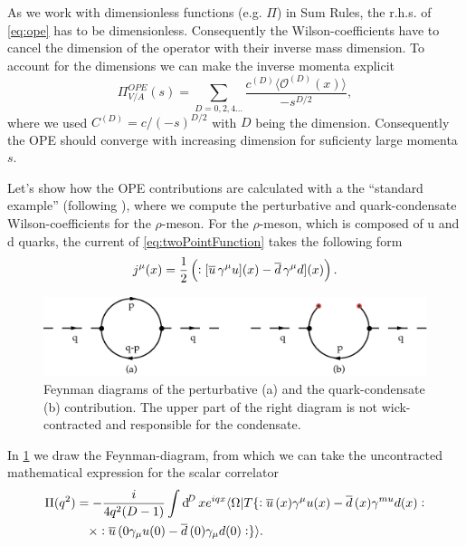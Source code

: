 \documentclass[../../index.tex]{subfiles}
\begin{document}
As we work with dimensionless functions (e.g. $\Pi$) in Sum Rules, the r.h.s. of
\cref{eq:ope} has to be dimensionless. Consequently the Wilson-coefficients have
to cancel the dimension of the operator with their inverse mass dimension. To
account for the dimensions we can make the inverse momenta explicit
\begin{equation}
  \Pi_{V/A}^{OPE}(s) = \sum_{D=0,2,4\dots} \frac{c^{(D)} \langle \mathcal{O}^{(D)}(x) \rangle}{-s^{D/2}},
\end{equation}
where we used $C^{(D)}=c/(-s)^{D/2}$ with $D$ being the dimension. Consequently
the OPE should converge with increasing dimension for suficienty large momenta
$s$.

Let's show how the OPE contributions are calculated with a the ``standard
example'' (following \cite{Pascual1986}), where we compute the perturbative and
quark-condensate Wilson-coefficients for the $\rho$-meson. For the $\rho$-meson,
which is composed of u and d quarks, the current of \cref{eq:twoPointFunction}
takes the following form
\begin{equation}
  j^\mu(x) = \frac{1}{2}\left(:[\overline{u}\, \gamma^\mu u](x) - \overline{d}\, \gamma^\mu d](x)\right).
\end{equation}
\begin{figure}
  \centering
  \includegraphics[width=\textwidth]{./images/condensateFeynmanDiagram.eps}
  \caption{Feynman diagrams of the perturbative (a) and the quark-condensate (b)
    contribution. The upper part of the right diagram is not wick-contracted and
    responsible for the condensate.}
  \label{fig:OPEFeynmanDiagram}
\end{figure}
In \cref{fig:OPEFeynmanDiagram} we draw the Feynman-diagram, from which we can
take the uncontracted mathematical expression for the scalar correlator
\begin{equation}
  \begin{split}
    \Pi(q^2) &= - \frac{i}{4 q^2 (D -1)} \int \dif^D x e^{iqx} \langle \Omega | T \{:\anti{u}(x) \gamma^\mu u(x) - \anti{d}(x) \gamma^{mu} d(x): \\
    &\quad\times :\anti{u}(0 \gamma_\mu u(0) - \anti{d}(0)\gamma_\mu d(0): \}
    \rangle.
  \end{split}
\end{equation}
\end{document}
